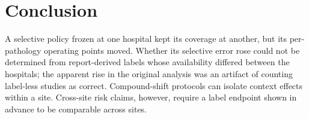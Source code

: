\section*{Conclusion}

A selective policy frozen at one hospital kept its coverage at another, but its
per-pathology operating points moved. Whether its selective error rose could
not be determined from report-derived labels whose availability differed
between the hospitals; the apparent rise in the original analysis was an artifact of
counting label-less studies as correct. Compound-shift protocols can isolate
context effects within a site. Cross-site risk claims, however, require a label
endpoint shown in advance to be comparable across sites.
